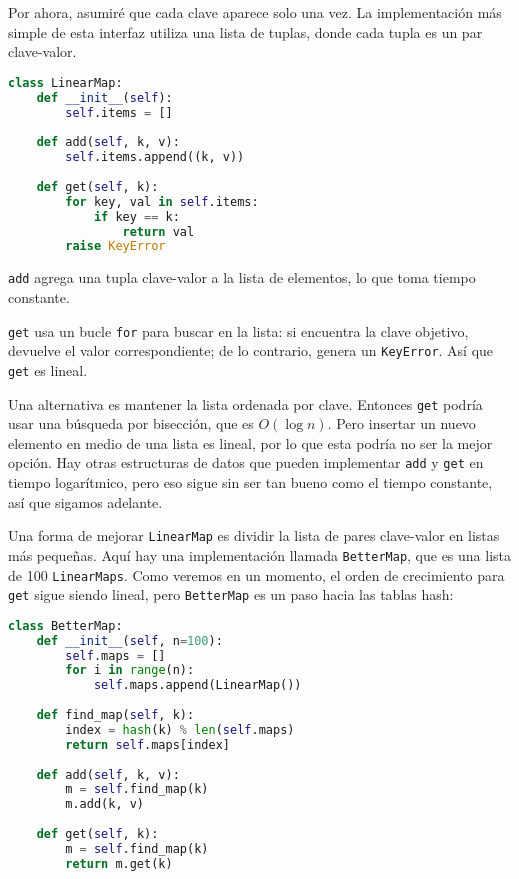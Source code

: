 Por ahora, asumiré que cada clave aparece solo una vez. La implementación más simple de esta interfaz utiliza una lista de tuplas, donde cada tupla es un par clave-valor.

\begin{lstlisting}[language=Python]
class LinearMap:
    def __init__(self):
        self.items = []
    
    def add(self, k, v):
        self.items.append((k, v))
    
    def get(self, k):
        for key, val in self.items:
            if key == k:
                return val
        raise KeyError
\end{lstlisting}

\texttt{add} agrega una tupla clave-valor a la lista de elementos, lo que toma tiempo constante.

\texttt{get} usa un bucle \texttt{for} para buscar en la lista: si encuentra la clave objetivo, devuelve el valor correspondiente; de lo contrario, genera un \texttt{KeyError}. Así que \texttt{get} es lineal.

Una alternativa es mantener la lista ordenada por clave. Entonces \texttt{get} podría usar una búsqueda por bisección, que es \( O(\log n) \). Pero insertar un nuevo elemento en medio de una lista es lineal, por lo que esta podría no ser la mejor opción. Hay otras estructuras de datos que pueden implementar \texttt{add} y \texttt{get} en tiempo logarítmico, pero eso sigue sin ser tan bueno como el tiempo constante, así que sigamos adelante.

Una forma de mejorar \texttt{LinearMap} es dividir la lista de pares clave-valor en listas más pequeñas. Aquí hay una implementación llamada \texttt{BetterMap}, que es una lista de 100 \texttt{LinearMaps}. Como veremos en un momento, el orden de crecimiento para \texttt{get} sigue siendo lineal, pero \texttt{BetterMap} es un paso hacia las tablas hash:

\begin{lstlisting}[language=Python]
class BetterMap:
    def __init__(self, n=100):
        self.maps = []
        for i in range(n):
            self.maps.append(LinearMap())
    
    def find_map(self, k):
        index = hash(k) % len(self.maps)
        return self.maps[index]
    
    def add(self, k, v):
        m = self.find_map(k)
        m.add(k, v)
    
    def get(self, k):
        m = self.find_map(k)
        return m.get(k)
\end{lstlisting}

